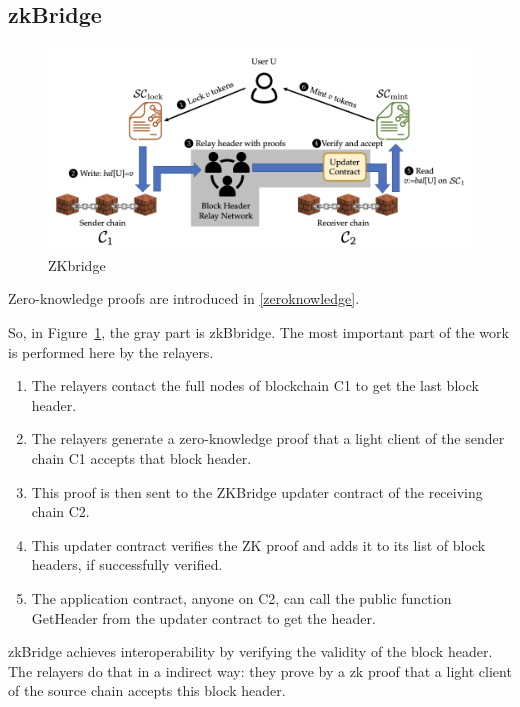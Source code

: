 \subsection{zkBridge \cite{xie2022zkbridge}}
\begin{figure}[H]
    \centering
\includegraphics[width=0.8\linewidth]{interoperability/zkbridge.png}
    \caption{ZKbridge \cite{xie2022zkbridge}}
    \label{fig:zkbridge}
\end{figure}

Zero-knowledge proofs are introduced in \ref{zeroknowledge}.

So, in Figure~\ref{fig:zkbridge}, the gray part is zkBbridge. The most important part of the work is performed here by the relayers. 
\begin{enumerate}
    \item The relayers contact the full nodes of blockchain C1 to get the last block header.%
    \item The relayers generate a zero-knowledge proof that a light client of the sender chain C1 accepts that block header.
    \item This proof is then sent to the ZKBridge updater contract of the receiving chain C2.
    \item This updater contract verifies the ZK proof and adds it to its list of block headers, if successfully verified.
    \item The application contract, anyone on C2, can call the public function GetHeader from the updater contract to get the header. 
\end{enumerate}

zkBridge achieves interoperability by verifying the validity of the block header. The relayers do that in a indirect way: they prove by a zk proof that a light client of the source chain accepts this block header. 

